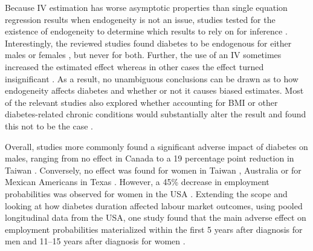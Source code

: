 Because \ac{IV} estimation has worse asymptotic properties than single equation regression results when endogeneity is not an issue, studies tested for the existence of endogeneity to determine which results to rely on for inference \parencite{Brown2005,Minor2011,Latif2009,Lin2011b}. Interestingly, the reviewed studies found diabetes to be endogenous for either males \parencite{Latif2009} or females \parencite{Brown2005,Minor2011}, but never for both. Further, the use of an \ac{IV} sometimes increased the estimated effect\parencite{Minor2011,Lin2011b} whereas in other cases the effect turned insignificant \parencite{Brown2005,Latif2009}. As a result, no unambiguous conclusions can be drawn as to how endogeneity affects diabetes and whether or not it causes biased estimates. Most of the relevant studies also explored whether accounting for \ac{BMI} or other diabetes-related chronic conditions would substantially alter the result and found this not to be the case \parencite{Brown2005,Latif2009,Minor2013}.

Overall, studies more commonly found a significant adverse impact of diabetes on males, ranging from no effect in Canada \parencite{Latif2009} to a 19 percentage point reduction in Taiwan \parencite{Lin2011b}. Conversely, no effect was found for women in Taiwan  \parencite{Lin2011b}, Australia  \parencite{Zhang2009} or for Mexican Americans in Texas \parencite{Brown2005}. However, a 45\% decrease in employment probabilities was observed for women in the USA \parencite{Minor2011}. Extending the scope and looking at how diabetes duration affected labour market outcomes, using pooled longitudinal data from the USA, one study found that the main adverse effect on employment probabilities materialized within the first 5 years after diagnosis for men and 11--15 years after diagnosis for women \parencite{Minor2013}.

